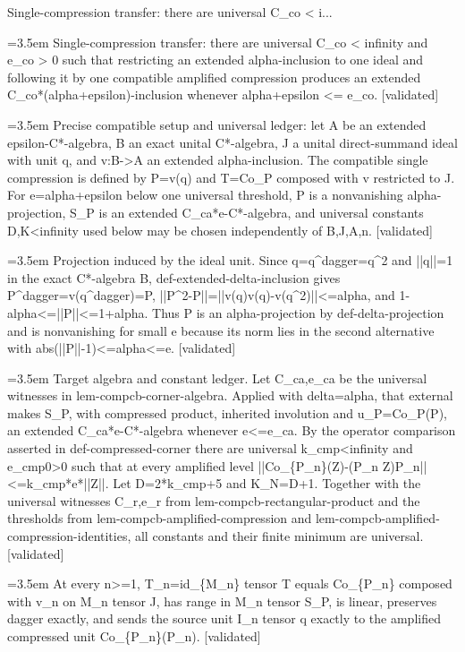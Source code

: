 \documentclass{article}
\newcommand{\step}[1]{\par\noindent\hangindent=3.5em\hangafter=1%
  \makebox[3.5em][l]{\textbf{#1.}}}
\newcommand{\steptag}[1]{\hfill{\small\textsf{[#1]}}}
\begin{document}
\begin{proofbox}{Single-compression transfer: there are universal C\_co < i...}
\step{1} Single-compression transfer: there are universal C\_co < infinity and e\_co > 0 such that restricting an extended alpha-inclusion to one ideal and following it by one compatible amplified compression produces an extended C\_co*(alpha+epsilon)-inclusion whenever alpha+epsilon <= e\_co. \steptag{validated} \\[6pt]
\step{1.1} Precise compatible setup and universal ledger: let A be an extended epsilon-C*-algebra, B an exact unital C*-algebra, J a unital direct-summand ideal with unit q, and v:B->A an extended alpha-inclusion. The compatible single compression is defined by P=v(q) and T=Co\_P composed with v restricted to J. For e=alpha+epsilon below one universal threshold, P is a nonvanishing alpha-projection, S\_P is an extended C\_ca*e-C*-algebra, and universal constants D,K<infinity used below may be chosen independently of B,J,A,n. \steptag{validated} \\[6pt]
\step{1.1.1} Projection induced by the ideal unit. Since q=q\textasciicircum{}dagger=q\textasciicircum{}2 and ||q||=1 in the exact C*-algebra B, def-extended-delta-inclusion gives P\textasciicircum{}dagger=v(q\textasciicircum{}dagger)=P, ||P\textasciicircum{}2-P||=||v(q)v(q)-v(q\textasciicircum{}2)||<=alpha, and 1-alpha<=||P||<=1+alpha. Thus P is an alpha-projection by def-delta-projection and is nonvanishing for small e because its norm lies in the second alternative with abs(||P||-1)<=alpha<=e. \steptag{validated} \\[4pt]
\step{1.1.2} Target algebra and constant ledger. Let C\_ca,e\_ca be the universal witnesses in lem-compcb-corner-algebra. Applied with delta=alpha, that external makes S\_P, with compressed product, inherited involution and u\_P=Co\_P(P), an extended C\_ca*e-C*-algebra whenever e<=e\_ca. By the operator comparison asserted in def-compressed-corner there are universal k\_cmp<infinity and e\_cmp0>0 such that at every amplified level ||Co\_\{P\_n\}(Z)-(P\_n Z)P\_n||<=k\_cmp*e*||Z||. Let D=2*k\_cmp+5 and K\_N=D+1. Together with the universal witnesses C\_r,e\_r from lem-compcb-rectangular-product and the thresholds from lem-compcb-amplified-compression and lem-compcb-amplified-compression-identities, all constants and their finite minimum are universal. \steptag{validated} \\[4pt]
\step{1.2} At every n>=1, T\_n=id\_\{M\_n\} tensor T equals Co\_\{P\_n\} composed with v\_n on M\_n tensor J, has range in M\_n tensor S\_P, is linear, preserves dagger exactly, and sends the source unit I\_n tensor q exactly to the amplified compressed unit Co\_\{P\_n\}(P\_n). \steptag{validated} \\[6pt]

\end{proofbox}
\end{document}
